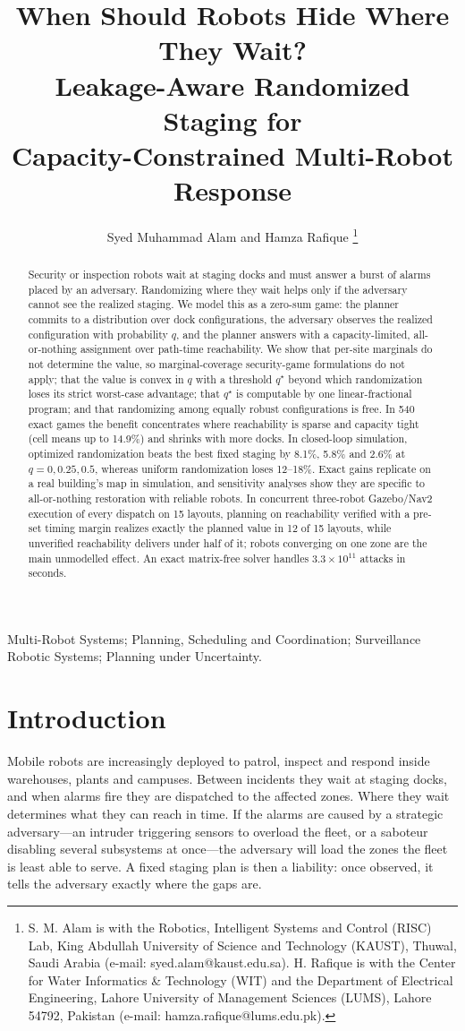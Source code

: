 \documentclass[letterpaper,journal]{IEEEtran}
\title{When Should Robots Hide Where They Wait?\\ Leakage-Aware Randomized Staging for\\ Capacity-Constrained Multi-Robot Response}
\author{Syed Muhammad Alam and Hamza Rafique%
\thanks{S. M. Alam is with the Robotics, Intelligent Systems and Control (RISC) Lab, King Abdullah University of Science and Technology (KAUST), Thuwal, Saudi Arabia (e-mail: syed.alam@kaust.edu.sa). H. Rafique is with the Center for Water Informatics \& Technology (WIT) and the Department of Electrical Engineering, Lahore University of Management Sciences (LUMS), Lahore 54792, Pakistan (e-mail: hamza.rafique@lums.edu.pk).}}
\theoremstyle{remark}
\begin{document}
\maketitle
\thispagestyle{empty}\pagestyle{empty}  %

\begin{abstract}
Security or inspection robots wait at staging docks and must answer a burst of alarms placed by an adversary. Randomizing where they wait helps only if the adversary cannot see the realized staging. We model this as a zero-sum game: the planner commits to a distribution over dock configurations, the adversary observes the realized configuration with probability $q$, and the planner answers with a capacity-limited, all-or-nothing assignment over path-time reachability. We show that per-site marginals do not determine the value, so marginal-coverage security-game formulations do not apply; that the value is convex in $q$ with a threshold $q^\star$ beyond which randomization loses its strict worst-case advantage; that $q^\star$ is computable by one linear-fractional program; and that randomizing among equally robust configurations is free. In 540 exact games the benefit concentrates where reachability is sparse and capacity tight (cell means up to 14.9\%) and shrinks with more docks. In closed-loop simulation, optimized randomization beats the best fixed staging by 8.1\%, 5.8\% and 2.6\% at $q=0,0.25,0.5$, whereas uniform randomization loses 12--18\%. Exact gains replicate on a real building's map in simulation, and sensitivity analyses show they are specific to all-or-nothing restoration with reliable robots. In concurrent three-robot Gazebo/Nav2 execution of every dispatch on 15 layouts, planning on reachability verified with a pre-set timing margin realizes exactly the planned value in 12 of 15 layouts, while unverified reachability delivers under half of it; robots converging on one zone are the main unmodelled effect. An exact matrix-free solver handles $3.3\times10^{11}$ attacks in seconds.
\end{abstract}

\begin{IEEEkeywords}
Multi-Robot Systems; Planning, Scheduling and Coordination; Surveillance Robotic Systems; Planning under Uncertainty.
\end{IEEEkeywords}

\section{Introduction}
Mobile robots are increasingly deployed to patrol, inspect and respond inside warehouses, plants and campuses. Between incidents they wait at staging docks, and when alarms fire they are dispatched to the affected zones. Where they wait determines what they can reach in time. If the alarms are caused by a strategic adversary---an intruder triggering sensors to overload the fleet, or a saboteur disabling several subsystems at once---the adversary will load the zones the fleet is least able to serve. A fixed staging plan is then a liability: once observed, it tells the adversary exactly where the gaps are.
\end{document}
